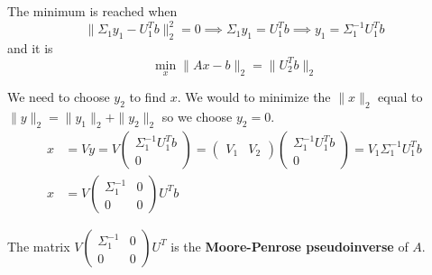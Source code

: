 The minimum is reached when 
$$\| \Sigma_1 y_1 - U_1^T b \|_2^2 = 0 \implies \Sigma_1 y_1 = U_1^T b \implies y_1 = \Sigma_1^{-1} U_1^T b$$
and it is
\[
\min_x \| Ax - b \|_2 = \| U_2^T b \|_2
\]

We need to choose $y_2$ to find $x$. We would to minimize the $\| x \|_2$ equal to $\| y \|_2 = \| y_1 \|_2 + \| y_2 \|_2$ so
we choose $y_2 = 0$.
$$
\begin{aligned}
    x &= Vy = V\begin{pmatrix} \Sigma_1^{-1} U_1^T b \\ 0 \end{pmatrix} = \begin{pmatrix} V_1 & V_2 \end{pmatrix} \begin{pmatrix} \Sigma_1^{-1} U_1^T b \\ 0 \end{pmatrix} = V_1 \Sigma_1^{-1} U_1^T b \\
    x &= V \begin{pmatrix} \Sigma_1^{-1} & 0 \\ 0 & 0 \end{pmatrix} U^T b
\end{aligned}
$$

The matrix $V \begin{pmatrix} \Sigma_1^{-1} & 0 \\ 0 & 0 \end{pmatrix} U^T$ is the \textbf{Moore-Penrose pseudoinverse} of $A$.
